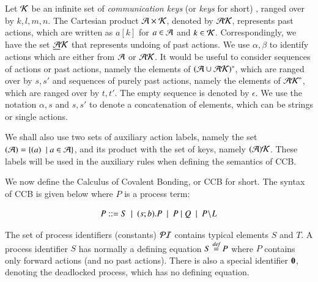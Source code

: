 Let $\mathcal{K}$ be an infinite set of {\em communication keys} (or {\em keys} for short)
\cite{PhillipsUlidowski06,Irek2007}, ranged over by $k,l, m,n$. The Cartesian product $\mathcal A \times \mathcal{K}$, denoted by $\mathcal{AK}$,
 represents past actions, which are written as $a[k]$ for $a\in \mathcal{A}$ and $k\in\mathcal{K}$. 
Correspondingly, we have the set $\underline{\mathcal{A}}\mathcal{K}$ that represents undoing of past actions. We use $\alpha, \beta$ to identify actions which are either from $\mathcal{A}$ or $\mathcal{AK}$. It would be 
useful to consider sequences of actions or past actions, namely the elements of $(\mathcal{A} \cup \mathcal{AK})^*$, 
which are ranged over by $s,s'$ and sequences of purely past actions, namely the elements of $\mathcal{AK}^*$, 
which are ranged over by $t,t'$. The empty sequence is denoted by $\epsilon$. We use the notation $\alpha, s$ and
$s,s'$ to denote a concatenation of elements, which can be strings or single actions.

We shall also use two sets of auxiliary action labels, namely the set $(\mathcal{A}) =\{ (a)\ \mid a\in\mathcal{A}\}$, and its product with the set of keys, namely $(\mathcal{A})\mathcal{K}$. These labels will be used in the auxiliary rules when defining
the semantics of CCB.

We now define the Calculus of Covalent Bonding, or CCB for short. The syntax of CCB is given 
below where $P$ is a process term:

$$P ::=  S \ \mid \ (s;b).P \ \mid \ P\paral Q \ \mid \ P\restrict L $$

The set of process identifiers (constants) $\mathcal{PI}$ contains typical elements $S$ and $T$. 
A process identifier $S$ has normally a defining equation $S\stackrel{\emph{def}}{=} P$ where $P$ contains only forward 
actions (and no past actions). There is also a special identifier
 $\mathbf{0}$, denoting the deadlocked process, which has no defining equation.

